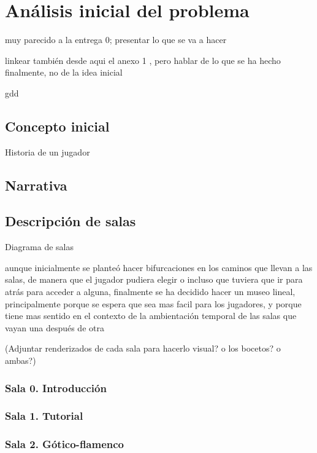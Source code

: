 \chapter{Análisis inicial del problema}
\label{chap:analisis_problema}

muy parecido a la entrega 0; presentar lo que se va a hacer

linkear también desde aqui el anexo 1 , pero hablar de lo que se ha hecho finalmente, no de la idea inicial

gdd

\section{Concepto inicial}

Historia de un jugador

\section{Narrativa}

\section{Descripción de salas}

Diagrama de salas

aunque inicialmente se planteó hacer bifurcaciones en los caminos que llevan a las salas, de manera que el jugador pudiera elegir o incluso que tuviera que ir para atrás para acceder a alguna, finalmente se ha decidido hacer un museo lineal, principalmente porque se espera que sea mas facil para los jugadores, y porque tiene mas sentido en el contexto de la ambientación temporal de las salas que vayan una después de otra

(Adjuntar renderizados de cada sala para hacerlo visual? o los bocetos? o ambas?)


\subsection{Sala 0. Introducción}

\subsection{Sala 1. Tutorial}

\subsection{Sala 2. Gótico-flamenco}


